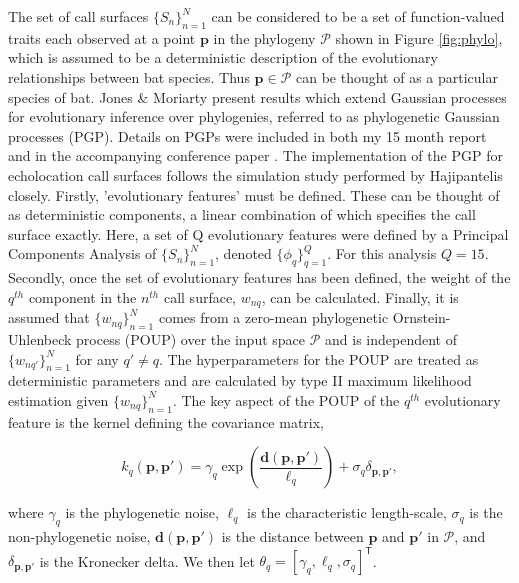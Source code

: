 \documentclass[]{article}
\begin{document}
The set of call surfaces \(\{S_n\}_{n = 1}^N\) can be considered to be a set of function-valued traits \cite{meyer2005up} each observed at a point \(\mathbf{p}\) in the phylogeny \(\mathcal{P}\) shown in Figure \ref{fig:phylo}, which is assumed to be a deterministic description of the evolutionary relationships between bat species. Thus \(\mathbf{p} \in \mathcal{P}\) can be thought of as a particular species of bat. Jones \& Moriarty \cite{jones2013evolutionary} present results which extend Gaussian processes \cite{rasmussen2006gaussian} for evolutionary inference over phylogenies, referred to as phylogenetic Gaussian processes (PGP). Details on PGPs were included in both my 15 month report and in the accompanying conference paper \cite{meagher2017pgp}. The implementation of the PGP for echolocation call surfaces follows the simulation study performed by Hajipantelis \cite{hadjipantelis2013function} closely. Firstly, 'evolutionary features' must be defined. These can be thought of as deterministic components, a linear combination of which specifies the call surface exactly. Here, a set of Q evolutionary features were defined by a Principal Components Analysis of \(\{S_n\}_{n = 1}^N\), denoted \(\{\phi_q\}_{q = 1}^Q\). For this analysis \(Q = 15\). Secondly, once the set of evolutionary features has been defined, the weight of the \(q^{th}\) component in the \(n^{th}\) call surface, \(w_{nq}\), can be calculated. Finally, it is assumed that \(\{w_{nq}\}_{n = 1}^N\) comes from a zero-mean phylogenetic Ornstein-Uhlenbeck process (POUP) over the input space \(\mathcal{P}\) and is independent of \(\{w_{nq'}\}_{n = 1}^N\) for any \(q' \ne q\). The hyperparameters for the POUP are treated as deterministic parameters and are calculated by type II maximum likelihood estimation given \(\{w_{nq}\}_{n = 1}^N\). The key aspect of the POUP of the \(q^{th}\) evolutionary feature is the kernel defining the covariance matrix,

\begin{equation}
k_q(\mathbf{p}, \mathbf{p}') = \gamma_q \exp\left(\frac{\mathbf{d}(\mathbf{p}, \mathbf{p}')}{\ell_q}\right) + \sigma_q\delta_{\mathbf{p}, \mathbf{p}'},
\label{eq:kernel}
\end{equation}

where \(\gamma_q\) is the phylogenetic noise, \(\ell_q\) is the characteristic length-scale, \(\sigma_q\) is the non-phylogenetic noise, \(\mathbf{d}(\mathbf{p}, \mathbf{p}')\) is the distance between \(\mathbf{p}\) and \(\mathbf{p}'\) in \(\mathcal{P}\), and \(\delta_{\mathbf{p}, \mathbf{p}'}\) is the Kronecker delta. We then let \(\theta_q = [\gamma_q, \ell_q, \sigma_q]^\mathsf{T}\).
\end{document}

